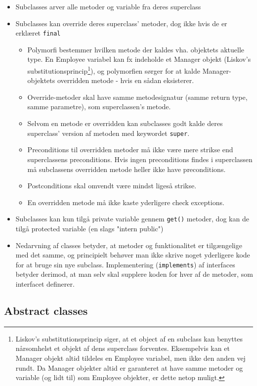 \begin{itemize}
  \item Subclasses arver alle metoder og variable fra deres superclass
  \item Subclasses kan override deres superclass' metoder, dog ikke hvis de er erklæret \verb|final|
  \begin{itemize}
    \item Polymorfi bestemmer hvilken metode der kaldes vha. objektets aktuelle type. En Employee variabel kan fx indeholde et Manager objekt (Liskov's substitutionsprincip\footnote{Liskov's substitutionsprincip siger, at et object af en subclass kan benyttes nårsomhelst et objekt af dens superclass forventes. Eksempelvis kan et Manager objekt altid tildeles en Employee variabel, men ikke den anden vej rundt. Da Manager objekter altid er garanteret at have samme metoder og variable (og lidt til) som Employee objekter, er dette netop muligt.}), og polymorfien sørger for at kalde Manager-objektets overridden metode - hvis en sådan eksisterer.
    \item Override-metoder skal have samme metodesignatur (samme return type, samme parametre), som superclassen's metode.
    \item Selvom en metode er overridden kan subclasses godt kalde deres superclass' version af metoden med keywordet \verb|super|.
    \item Preconditions til overridden metoder må ikke være mere strikse end superclassens preconditions. Hvis ingen preconditions findes i superclassen må subclassens overridden metode heller ikke have preconditions.
    \item Postconditions skal omvendt være mindst ligeså strikse.
    \item En overridden metode må ikke kaste yderligere check exceptions.
  \end{itemize}

  \item Subclasses kan kun tilgå private variable gennem \verb|get()| metoder, dog kan de tilgå protected variable (en slags "intern public")
  \item Nedarvning af classes betyder, at metoder og funktionalitet er tilgængelige med det samme, og principielt behøver man ikke skrive noget yderligere kode for at bruge sin nye subclass. Implementering (\verb|implements|) af interfaces betyder derimod, at man selv skal supplere koden for hver af de metoder, som interfacet definerer.
\end{itemize}

\subsection{Abstract classes}

